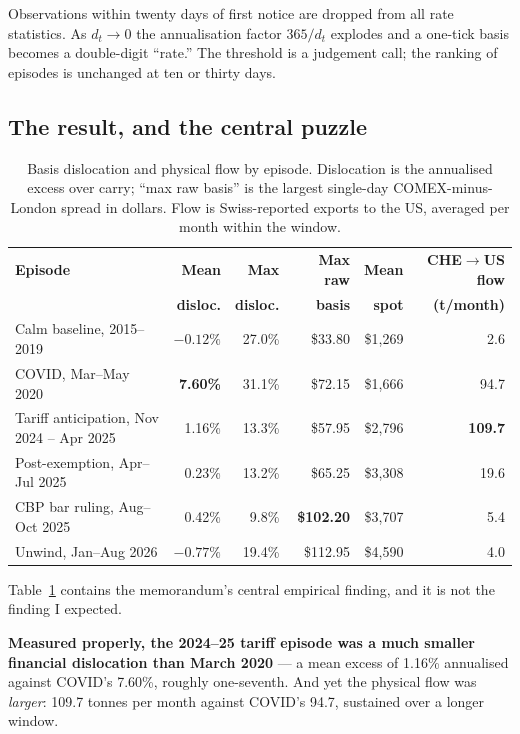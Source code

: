 \documentclass[11pt,a4paper]{article}
\begin{document}
Observations within twenty days of first notice are dropped from all rate statistics. As $d_t
\to 0$ the annualisation factor $365/d_t$ explodes and a one-tick basis becomes a double-digit
``rate.'' The threshold is a judgement call; the ranking of episodes is unchanged at ten or
thirty days.

\subsection{The result, and the central puzzle}

\begin{table}[h]
\centering
\small
\begin{tabular}{@{}lrrrrr@{}}
\toprule
\textbf{Episode} & \textbf{Mean} & \textbf{Max} & \textbf{Max raw} & \textbf{Mean} &
\textbf{CHE$\to$US flow} \\
 & \textbf{disloc.} & \textbf{disloc.} & \textbf{basis} & \textbf{spot} & \textbf{(t/month)} \\
\midrule
Calm baseline, 2015--2019 & $-0.12\%$ & 27.0\% & \$33.80 & \$1{,}269 & 2.6 \\
COVID, Mar--May 2020 & \textbf{7.60\%} & 31.1\% & \$72.15 & \$1{,}666 & 94.7 \\
Tariff anticipation, Nov 2024 -- Apr 2025 & 1.16\% & 13.3\% & \$57.95 & \$2{,}796 &
\textbf{109.7} \\
Post-exemption, Apr--Jul 2025 & 0.23\% & 13.2\% & \$65.25 & \$3{,}308 & 19.6 \\
CBP bar ruling, Aug--Oct 2025 & 0.42\% & 9.8\% & \textbf{\$102.20} & \$3{,}707 & 5.4 \\
Unwind, Jan--Aug 2026 & $-0.77\%$ & 19.4\% & \$112.95 & \$4{,}590 & 4.0 \\
\bottomrule
\end{tabular}
\caption{Basis dislocation and physical flow by episode. Dislocation is the annualised excess
over carry; ``max raw basis'' is the largest single-day COMEX-minus-London spread in dollars.
Flow is Swiss-reported exports to the US, averaged per month within the window.}
\label{tab:puzzle}
\end{table}

Table~\ref{tab:puzzle} contains the memorandum's central empirical finding, and it is not the
finding I expected.

\textbf{Measured properly, the 2024--25 tariff episode was a much smaller financial dislocation
than March 2020} --- a mean excess of 1.16\% annualised against COVID's 7.60\%, roughly
one-seventh. And yet the physical flow was \emph{larger}: 109.7 tonnes per month against
COVID's 94.7, sustained over a longer window.
\end{document}
